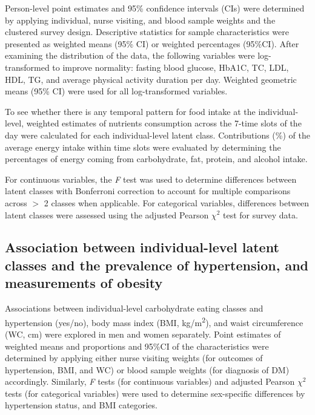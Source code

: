 Person-level point estimates and 95\% confidence intervals (CIs) were determined by applying individual, nurse visiting, and blood sample weights and the clustered survey design. Descriptive statistics for sample characteristics were presented as weighted means (95\% CI) or weighted percentages (95\%CI). After examining the distribution of the data, the following variables were log-transformed to improve normality: fasting blood glucose, HbA1C, TC, LDL, HDL, TG, and average physical activity duration per day. Weighted geometric means (95\% CI) were used for all log-transformed variables. 

To see whether there is any temporal pattern for food intake at the individual-level, weighted estimates of nutrients consumption across the 7-time slots of the day were calculated for each individual-level latent class. Contributions (\%) of the average energy intake within time slots were evaluated by determining the percentages of energy coming from carbohydrate, fat, protein, and alcohol intake. 

For continuous variables, the \textit{F} test was used to determine differences between latent classes with Bonferroni correction to account for multiple comparisons across $>$ 2 classes when applicable. For categorical variables, differences between latent classes were assessed using the adjusted Pearson $\chi^2$ test for survey data.\vspace{-0.5cm}


\subsection{Association between individual-level latent classes and the prevalence of hypertension, and measurements of obesity}\vspace{-0.3cm}


Associations between individual-level carbohydrate eating classes and hypertension (yes/no), body mass index (BMI, kg/m\textsuperscript{2}), and waist circumference (WC, cm) were explored in men and women separately. Point estimates of weighted means and proportions and 95\%CI of the characteristics were determined by applying either nurse visiting weights (for outcomes of hypertension, BMI, and WC) or blood sample weights (for diagnosis of DM) accordingly. Similarly, \textit{F} tests (for continuous variables) and adjusted Pearson $\chi^2$ tests (for categorical variables) were used to determine sex-specific differences by hypertension status, and BMI categories. 

